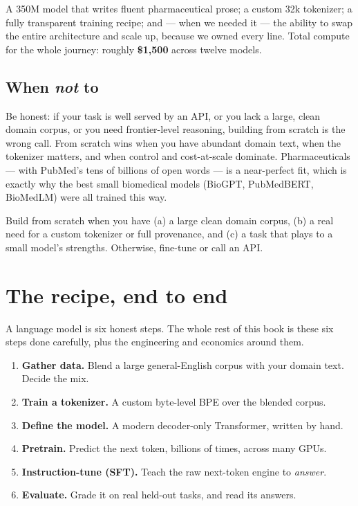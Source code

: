 \begin{numbers}
A 350M model that writes fluent pharmaceutical prose; a custom 32k tokenizer; a fully transparent training
recipe; and --- when we needed it --- the ability to swap the entire architecture and scale up, because we
owned every line. Total compute for the whole journey: roughly \textbf{\$1{,}500} across twelve models.
\end{numbers}

\section{When \emph{not} to}
Be honest: if your task is well served by an API, or you lack a large, clean domain corpus, or you need
frontier-level reasoning, building from scratch is the wrong call. From scratch wins when you have abundant
domain text, when the tokenizer matters, and when control and cost-at-scale dominate. Pharmaceuticals --- with
PubMed's tens of billions of open words --- is a near-perfect fit, which is exactly why the best small
biomedical models (BioGPT, PubMedBERT, BioMedLM) were all trained this way.

\begin{lesson}
Build from scratch when you have (a) a large clean domain corpus, (b) a real need for a custom tokenizer or
full provenance, and (c) a task that plays to a small model's strengths. Otherwise, fine-tune or call an API.
\end{lesson}

\chapter{The recipe, end to end}

A language model is six honest steps. The whole rest of this book is these six steps done carefully, plus
the engineering and economics around them.

\begin{enumerate}[leftmargin=2.2em]
  \item \textbf{Gather data.} Blend a large general-English corpus with your domain text. Decide the mix.
  \item \textbf{Train a tokenizer.} A custom byte-level BPE over the blended corpus.
  \item \textbf{Define the model.} A modern decoder-only Transformer, written by hand.
  \item \textbf{Pretrain.} Predict the next token, billions of times, across many GPUs.
  \item \textbf{Instruction-tune (SFT).} Teach the raw next-token engine to \emph{answer}.
  \item \textbf{Evaluate.} Grade it on real held-out tasks, and read its answers.
\end{enumerate}

